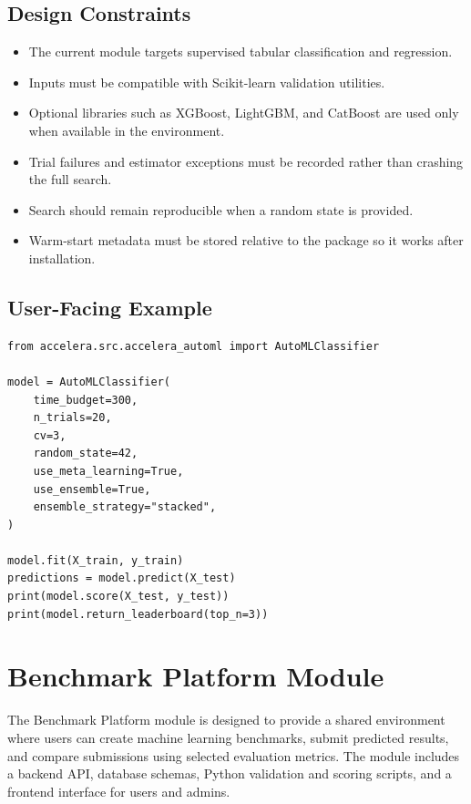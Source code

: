 \documentclass[12pt,a4paper]{report}
\begin{document}
\subsection{Design Constraints}
\begin{itemize}
  \item The current module targets supervised tabular classification and
  regression.
  \item Inputs must be compatible with Scikit-learn validation utilities.
  \item Optional libraries such as XGBoost, LightGBM, and CatBoost are used
  only when available in the environment.
  \item Trial failures and estimator exceptions must be recorded rather than
  crashing the full search.
  \item Search should remain reproducible when a random state is provided.
  \item Warm-start metadata must be stored relative to the package so it works
  after installation.
\end{itemize}

\subsection{User-Facing Example}
\begin{lstlisting}[style=code,caption={Using Accelera AutoML for classification},label={lst:automl_usage}]
from accelera.src.accelera_automl import AutoMLClassifier

model = AutoMLClassifier(
    time_budget=300,
    n_trials=20,
    cv=3,
    random_state=42,
    use_meta_learning=True,
    use_ensemble=True,
    ensemble_strategy="stacked",
)

model.fit(X_train, y_train)
predictions = model.predict(X_test)
print(model.score(X_test, y_test))
print(model.return_leaderboard(top_n=3))
\end{lstlisting}




\section{Benchmark Platform Module}
\noindent The Benchmark Platform module is designed to provide a shared
environment where users can create machine learning benchmarks, submit
predicted results, and compare submissions using selected evaluation metrics.
The module includes a backend API, database schemas, Python validation and
scoring scripts, and a frontend interface for users and admins.
\end{document}
